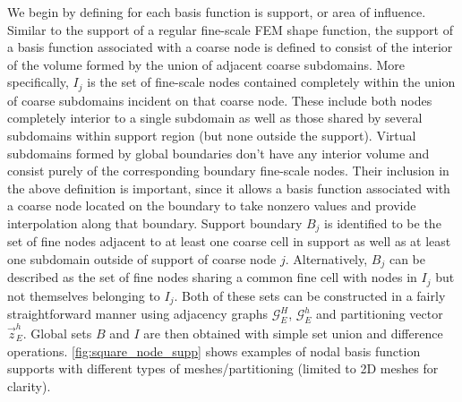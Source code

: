 We begin by defining for each basis function is support, or area of influence.   Similar to the support of a regular fine-scale FEM shape function, the support of a basis function associated with a coarse node is defined to consist of the interior of the volume formed by the union of adjacent coarse subdomains.   More specifically, $I_j$ is the set of fine-scale nodes contained completely within the union of coarse subdomains incident on that coarse node.   These include both nodes completely interior to a single subdomain as well as those shared by several subdomains within support region (but none outside the support).   Virtual subdomains formed by global boundaries don't have any interior volume and consist purely of the corresponding boundary fine-scale nodes.   Their inclusion in the above definition is important, since it allows a basis function associated with a coarse node located on the boundary to take nonzero values and provide interpolation along that boundary.   Support boundary $B_j$ is identified to be the set of fine nodes adjacent to at least one coarse cell in support as well as at least one subdomain outside of support of coarse node $j$.   Alternatively, $B_j$ can be described as the set of fine nodes sharing a common fine cell with nodes in $I_j$ but not themselves belonging to $I_j$.   Both of these sets can be constructed in a fairly straightforward manner using adjacency graphs $\mathcal{G}_E^H$, $\mathcal{G}_E^h$ and partitioning vector $\vec{z}_E^h$.   Global sets $B$ and $I$ are then obtained with simple set union and difference operations.   \autoref{fig:square_node_supp} shows examples of nodal basis function supports with different types of meshes/partitioning (limited to 2D meshes for clarity).

